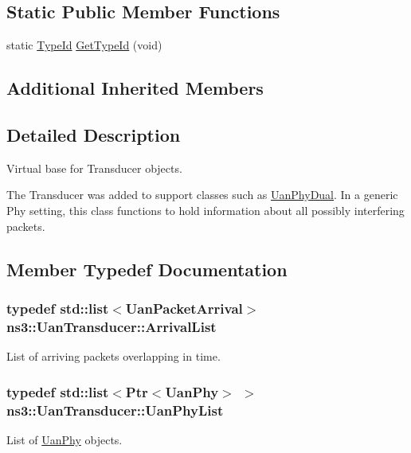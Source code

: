 \subsection*{Static Public Member Functions}
\begin{DoxyCompactItemize}
\item 
static \hyperlink{classns3_1_1TypeId}{Type\+Id} \hyperlink{classns3_1_1UanTransducer_a4cd4a61b847880521b0ecfd67950eb8f}{Get\+Type\+Id} (void)
\end{DoxyCompactItemize}
\subsection*{Additional Inherited Members}


\subsection{Detailed Description}
Virtual base for Transducer objects.

The Transducer was added to support classes such as \hyperlink{classns3_1_1UanPhyDual}{Uan\+Phy\+Dual}. In a generic Phy setting, this class functions to hold information about all possibly interfering packets. 

\subsection{Member Typedef Documentation}
\subsubsection[{\texorpdfstring{Arrival\+List}{ArrivalList}}]{\setlength{\rightskip}{0pt plus 5cm}typedef {\bf std\+::list}$<${\bf Uan\+Packet\+Arrival}$>$ {\bf ns3\+::\+Uan\+Transducer\+::\+Arrival\+List}}\hypertarget{classns3_1_1UanTransducer_a95332a21e30506421a116d4b5c4dfd75}{}\label{classns3_1_1UanTransducer_a95332a21e30506421a116d4b5c4dfd75}
List of arriving packets overlapping in time. 
\subsubsection[{\texorpdfstring{Uan\+Phy\+List}{UanPhyList}}]{\setlength{\rightskip}{0pt plus 5cm}typedef {\bf std\+::list}$<${\bf Ptr}$<${\bf Uan\+Phy}$>$ $>$ {\bf ns3\+::\+Uan\+Transducer\+::\+Uan\+Phy\+List}}\hypertarget{classns3_1_1UanTransducer_a3bac0e2447ad40f48533d14b10d01212}{}\label{classns3_1_1UanTransducer_a3bac0e2447ad40f48533d14b10d01212}
List of \hyperlink{classns3_1_1UanPhy}{Uan\+Phy} objects. 

